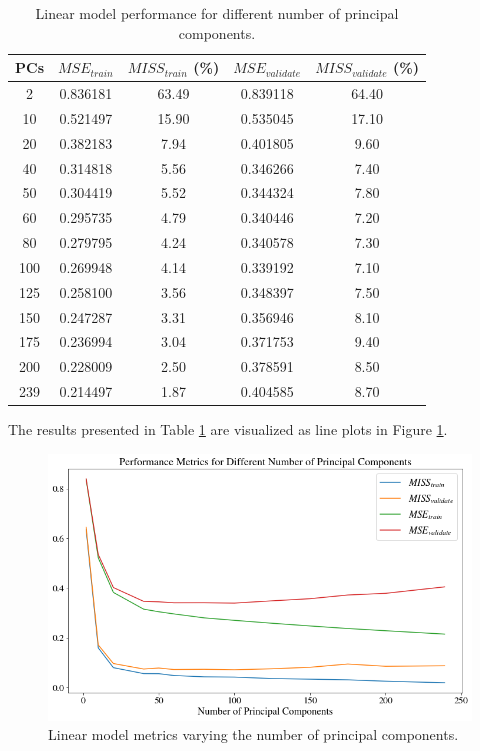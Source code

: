 \documentclass{article}
\begin{document}
\begin{table}[h!]
\begin{center}
 \begin{tabular}{||c | c | c | c | c||} 
 \hline
 PCs & $MSE_{train}$ & $MISS_{train}$ (\%) & $MSE_{validate}$ & $MISS_{validate}$ (\%) \\ [0.5ex]
 \hline\hline
 2 & 0.836181 & 63.49 & 0.839118 & 64.40\\ 
 \hline
 10 & 0.521497 & 15.90 & 0.535045 & 17.10\\
 \hline
 20 & 0.382183 & 7.94 & 0.401805 & 9.60\\
 \hline
 40 & 0.314818 & 5.56 & 0.346266 & 7.40\\
 \hline
 50 & 0.304419 & 5.52 & 0.344324 & 7.80\\
 \hline
  60 & 0.295735 & 4.79 & 0.340446 & 7.20\\
 \hline
  80 & 0.279795 & 4.24 & 0.340578 & 7.30\\
 \hline
  100 & 0.269948 & 4.14 & 0.339192 & 7.10\\
 \hline
  125 & 0.258100 & 3.56 & 0.348397 & 7.50\\
 \hline
  150 & 0.247287 & 3.31 & 0.356946 & 8.10\\
 \hline
  175 & 0.236994 & 3.04 & 0.371753 & 9.40\\
 \hline
  200 & 0.228009 & 2.50 & 0.378591 & 8.50\\
 \hline
  239 & 0.214497 & 1.87 & 0.404585 & 8.70\\
 \hline
\end{tabular}
\caption{Linear model performance for different number of principal components.}
\label{table:diff_pc}
\end{center}
\end{table}

The results presented in Table \ref{table:diff_pc} are visualized as line plots in Figure \ref{fig:diff_principal}.

\begin{figure}[h!]
    \centering
    \includegraphics[scale=0.42]{images/cv_pcs.png}
    \caption{Linear model metrics varying the number of principal components.}
    \label{fig:diff_principal}
\end{figure}
\end{document}
